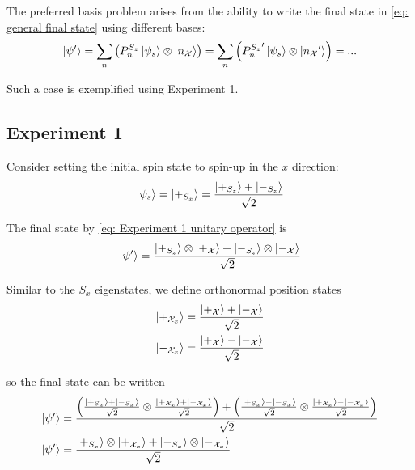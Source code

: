 The preferred basis problem arises from the ability to write the final state in \autoref{eq: general final state} using different bases:
\begin{align}  \label{eq: preferred basis state general}
  \ket{\psi'} = \sum_{n}\left(P^{S_z}_n\ket{\psi_s} \otimes \ket{n_\mathcal{X}}\right) = \sum_{n}\left({P^{S_z}_{n}}' \ket{\psi_s} \otimes \ket{{n_\mathcal{X}}'}\right) =...
\end{align}

Such a case is exemplified using Experiment 1.

\subsection{Experiment 1}

Consider setting the initial spin state to spin-up in the $x$ direction:
\begin{align}
  \ket{\psi_s} = \ket{+_{S_x}} = \frac{\ket{+_{S_z}} + \ket{-_{S_z}}}{\sqrt{2}}
\end{align}

The final state by \autoref{eq: Experiment 1 unitary operator} is
\begin{align} \label{eq:preferred basis state z}
  \ket{\psi'} = \frac{\ket{+_{S_z}}\otimes\ket{+_{\mathcal{X}}} + \ket{-_{S_z}}\otimes\ket{-_{\mathcal{X}}}}{\sqrt{2}}
\end{align}

Similar to the $S_x$ eigenstates, we define orthonormal position states
\begin{align}
  \ket{+_{\mathcal{X}_x}} = \frac{\ket{+_{\mathcal{X}}} + \ket{-_{\mathcal{X}}}}{\sqrt{2}} \\ \nonumber
  \ket{-_{\mathcal{X}_x}} = \frac{\ket{+_{\mathcal{X}}} - \ket{-_{\mathcal{X}}}}{\sqrt{2}}
\end{align}

so the final state can be written
\begin{align} \label{eq:preferred basis state x}
  \ket{\psi'} &= \frac{ \left(\frac{\ket{+_{S_x}} + \ket{-_{S_x}}}{\sqrt{2}} \otimes \frac{\ket{+_{\mathcal{X}_x}} + \ket{-_{\mathcal{X}_x}}}{\sqrt{2}} \right) +  \left(\frac{\ket{+_{S_x}} - \ket{-_{S_x}}}{\sqrt{2}} \otimes \frac{\ket{+_{\mathcal{X}_x}} - \ket{-_{\mathcal{X}_x}}}{\sqrt{2}} \right) }{\sqrt{2}} \\ \nonumber
  \ket{\psi'} &= \frac{\ket{+_{S_x}} \otimes \ket{+_{\mathcal{X}_x}} + \ket{-_{S_x}} \otimes \ket{-_{\mathcal{X}_x}}}{\sqrt{2}}
\end{align}

